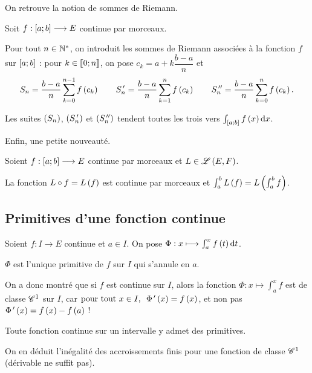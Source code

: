 On retrouve la notion de sommes de Riemann.

\begin{prop}
Soit \(f:\left[a;b\right]\longrightarrow E\) continue par morceaux.

Pour tout \(n\in\mathbb{N}^*\), on introduit les sommes de Riemann associées à la fonction \(f\) sur \(\left[a;b\right]\) : pour \(k\in\left\llbracket0;n\right\rrbracket\), on pose \(c_k=a+k\dfrac{b-a}{n}\) et \[S_n=\dfrac{b-a}{n}\sum_{k=0}^{n-1}f\left(c_k\right)\qquad S_n^{\,\prime}=\dfrac{b-a}{n}\sum_{k=1}^nf\left(c_k\right)\qquad S_n^{\,\prime\prime}=\dfrac{b-a}{n}\sum_{k=0}^nf\left(c_k\right).\]

Les suites \(\left(S_n\right)\), \(\left(S_n^{\,\prime}\right)\) et \(\left(S_n^{\,\prime\prime}\right)\) tendent toutes les trois vers \(\int_{\intervii{a}{b}}f\paren{x}\odif{x}\).
\end{prop}

Enfin, une petite nouveauté.

\begin{prop}
Soient \(f:\left[a;b\right]\longrightarrow E\) continue par morceaux et \(L\in\mathscr{L}\left(E,F\right)\).

La fonction \(L\circ f=L\left(f\right)\) est continue par morceaux et \(\int_a^bL\left(f\right)=L\left(\int_a^bf\right)\).
\end{prop}

\subsection{Primitives d'une fonction continue}

\begin{prop}
Soient \(f:I\to E\) continue et \(a\in I\). On pose \(\Phi:x\mapsto\int_a^xf\paren{t}\odif{t}\).

\(\Phi\) est l'unique primitive de \(f\) sur \(I\) qui s'annule en \(a\).
\end{prop}

\begin{rem}
On a donc montré que si \(f\) est continue sur \(I\), alors la fonction \(\Phi:x\mapsto\int_a^xf\) est de classe \(\mathscr{C}^{1}\) sur \(I\), car \(\quantifs{\tpt x\in I}\Phi\prim\paren{x}=f\paren{x}\), et non pas \(\Phi^{\,\prime}\left(x\right)=f\left(x\right)-f\left(a\right)\) !
\end{rem}

\begin{cor}
Toute fonction continue sur un intervalle y admet des primitives.
\end{cor}

On en déduit l'inégalité des accroissements finis pour une fonction de classe \(\mathscr{C}^{1}\) (dérivable ne suffit pas).

